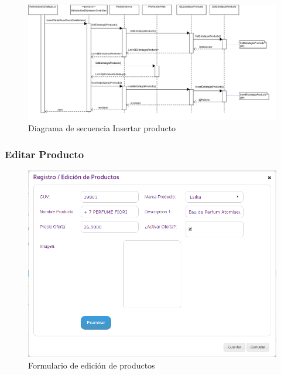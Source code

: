 \documentclass[a4paper,11pt]{paper}
\begin{document}
\begin{landscape}
\begin{figure}[!h]
\centering
\includegraphics[width=1.5\textwidth]{imgs/Producto/InsertarProducto.png}
\caption{Diagrama de secuencia Insertar producto}
\end{figure}
\end{landscape} 





\newpage
\subsubsection{Editar Producto}

\begin{figure}[h]
\centering
\includegraphics[width=1.0\textwidth]{imgs/Producto/FormularioEditarProducto.png}
\caption{Formulario de edición de productos}
\end{figure}
\end{document}

